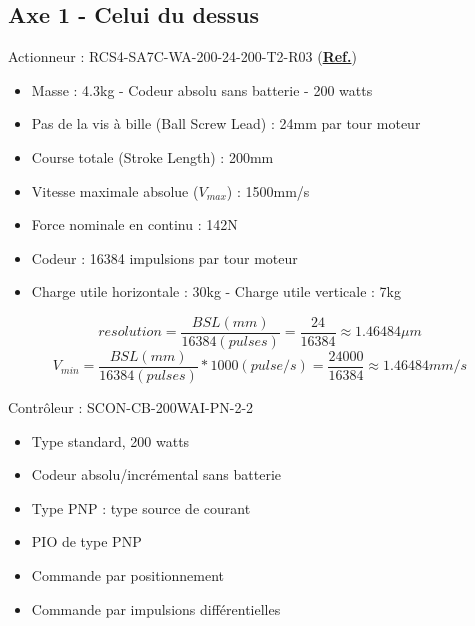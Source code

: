 \documentclass[a4paper,11pt]{beamer}
\begin{document}
\subsection{Axe 1 - Celui du dessus}
\begin{frame}
	\begin{block}{Actionneur : RCS4-SA7C-WA-200-24-200-T2-R03 (\textcolor{white}{\textbf{\underline{\href{https://raw.githubusercontent.com/fbuloup/Interface_IAI/main/Documentation/RCS4-SLIDER(ME3769-1H).pdf\#page=34}{Ref.}}}})}
		\begin{itemize}
			\item Masse : 4.3kg - Codeur absolu sans batterie - 200 watts
			\item Pas de la vis à bille (Ball Screw Lead) : 24mm par tour moteur
			\item Course totale (Stroke Length) : 200mm
			\item Vitesse maximale absolue ($V_{max}$) : 1500mm/s
			\item Force nominale en continu : 142N
			\item Codeur : 16384 impulsions par tour moteur
			\item Charge utile horizontale : 30kg - Charge utile verticale : 7kg
		\end{itemize}
	\end{block}
$$resolution=\frac{BSL(mm)}{16384(pulses)}=\frac{24}{16384} \approx 1.46484\mu m$$	
$$V_{min}=\frac{BSL(mm)}{16384(pulses)}*1000(pulse/s)=\frac{24000}{16384} \approx 1.46484mm/s$$
\end{frame}
\begin{frame}
	\begin{block}{Contrôleur : SCON-CB-200WAI-PN-2-2}
		\begin{itemize}
			\item Type standard, 200 watts
			\item Codeur absolu/incrémental sans batterie
			\item Type PNP : type source de courant
			\item PIO de type PNP
			\item Commande par positionnement
			\item Commande par impulsions différentielles
		\end{itemize}
	\end{block}
\end{frame}
\end{document}
